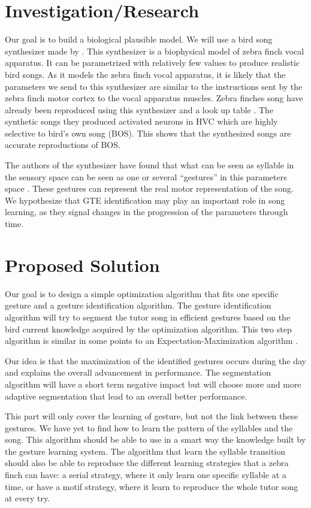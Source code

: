 \documentclass[a4paper]{article}
\begin{document}
\section*{Investigation/Research}

Our goal is to build a biological plausible model. We will use a bird song
synthesizer made by \textcite{boari_automatic_2015}. This synthesizer is a
biophysical model of zebra finch vocal apparatus. It can be parametrized with
relatively few values to produce realistic bird songs. As it models the zebra
finch vocal apparatus, it is likely that the parameters we send to this
synthesizer are similar to the instructions sent by the zebra finch motor cortex
to the vocal apparatus muscles. Zebra finches song have already been reproduced
using this synthesizer and a look up table \parencite{boari_automatic_2015}. The
synthetic songs they produced activated neurons in HVC which are highly
selective to bird's own song (BOS). This shows that the synthesized songs are
accurate reproductions of BOS.

The authors of the synthesizer have found that what can be seen as syllable in
the sensory space can be seen as one or several ``gestures'' in this parameters
space \parencite{amador_low_2014, boari_automatic_2015}. These gestures can
represent the real motor representation of the song. We hypothesize that GTE
identification may play an important role in song learning, as they signal
changes in the progression of the parameters through time.

\section*{Proposed Solution}

Our goal is to design a simple optimization algorithm that fits one specific
gesture and a gesture identification algorithm. The gesture identification
algorithm will try to segment the tutor song in efficient gestures based on the
bird current knowledge acquired by the optimization algorithm. This two step
algorithm is similar in some points to an Expectation-Maximization algorithm
\parencite{dempster_maximum_1977}.

Our idea is that the maximization of the identified gestures occurs during the
day and explains the overall advancement in performance. The segmentation
algorithm will have a short term negative impact but will choose more and more
adaptive segmentation that lead to an overall better performance.

This part will only cover the learning of gesture, but not the link between
these gestures. We have yet to find how to learn the pattern of the syllables
and the song. This algorithm should be able to use in a smart way the knowledge
built by the gesture learning system. The algorithm that learn the syllable
transition should also be able to reproduce the different learning strategies
that a zebra finch can have: a serial strategy, where it only learn one specific
syllable at a time, or have a motif strategy, where it learn to reproduce the
whole tutor song at every try.
\end{document}

